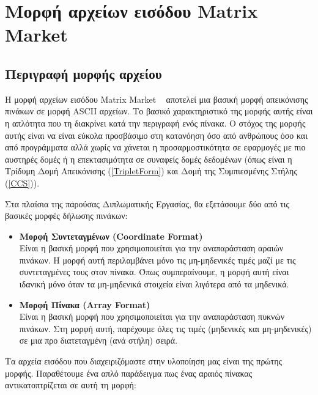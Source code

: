 ﻿%

\chapter{Μορφή αρχείων εισόδου \textlatin{Matrix Market}}
\label{ch:chapterMatrixMarketFormat}

\section {Περιγραφή μορφής αρχείου}
Η μορφή αρχείων εισόδου \textlatin{Matrix Market} ~\cite{boisvert1996matrix} αποτελεί μια βασική μορφή απεικόνισης πινάκων σε μορφή \textlatin{ASCII} αρχείων. Το βασικό χαρακτηριστικό της μορφής αυτής είναι η απλότητα που τη διακρίνει κατά την περιγραφή ενός πίνακα. Ο στόχος της μορφής αυτής είναι να είναι εύκολα προσβάσιμο στη κατανόηση όσο από ανθρώπους όσο και από προγράμματα αλλά χωρίς να χάνεται η προσαρμοστικότητα σε εφαρμογές με πιο αυστηρές δομές ή η επεκτασιμότητα σε συναφείς δομές δεδομένων (όπως είναι η Τρίδυμη Δομή Απεικόνισης (\ref{TripletForm}) και Δομή της Συμπιεσμένης Στήλης (\ref{CCS})).

Στα πλαίσια της παρούσας Διπλωματικής Εργασίας, θα εξετάσουμε δύο από τις βασικές μορφές δήλωσης πινάκων:

\begin{itemize}
    \item \textbf{Μορφή Συντεταγμένων (\textlatin{Coordinate Format})} \\
    Είναι η βασική μορφή που χρησιμοποιείται για την αναπαράσταση αραιών πινάκων. Η μορφή αυτή περιλαμβάνει μόνο τις μη-μηδενικές τιμές μαζί με τις συντεταγμένες τους στον πίνακα. Όπως συμπεραίνουμε, η μορφή αυτή είναι ιδανική μόνο όταν τα μη-μηδενικά στοιχεία είναι λιγότερα από τα μηδενικά.
    \item \textbf{Μορφή Πίνακα (\textlatin{Array Format})} \\
    Είναι η βασική μορφή που χρησιμοποιείται για την αναπαράσταση πυκνών πινάκων. Στη μορφή αυτή, παρέχουμε όλες τις τιμές (μηδενικές και μη-μηδενικές) σε μια προ διατεταγμένη (ανά στήλη) σειρά.
\end{itemize}

Τα αρχεία εισόδου που διαχειριζόμαστε στην υλοποίηση μας είναι της πρώτης μορφής. Παραθέτουμε ένα απλό παράδειγμα πως ένας αραιός πίνακας αντικατοπτρίζεται σε αυτή τη μορφή:

